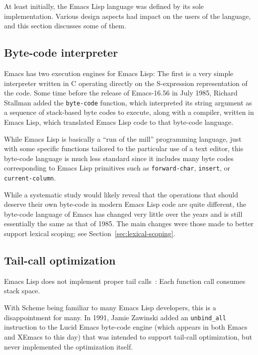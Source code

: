 \documentclass[format=acmsmall, review]{acmart}
\newcommand \Elisp {Emacs Lisp}
\begin{document}
At least initially, the \Elisp{} language was defined by its sole
implementation.  Various design aspects had impact on the users of the
language, and this section discusses some of them.

\subsection{Byte-code interpreter}
\label{sec:byte-code-interpreter}

Emacs has two execution engines for \Elisp: The first is a very simple
interpreter written in C operating directly on the S-expression
representation of the code.
Some time before the release of Emacs-16.56 in July 1985,
Richard Stallman added the \texttt{byte-code} function, which interpreted its string
argument as a sequence of stack-based byte codes to execute, along with
a compiler, written in \Elisp{}, which translated \Elisp{} code to that
byte-code language.

While \Elisp{} is basically a ``run of the mill'' programming language, just
with some specific functions tailored to the particular use of a text
editor, this byte-code language is much less standard since it includes many
byte codes corresponding to \Elisp{} primitives such as
\texttt{forward-char}, \texttt{insert}, or \texttt{current-column}.

While a systematic study would likely reveal that the operations that should
deserve their own byte-code in modern \Elisp{} code are quite different, the
byte-code language of Emacs has changed very little over the years and is
still essentially the same as that of 1985.  The main changes were
those made to better support lexical scoping; see Section~\ref{sec:lexical-scoping}.

\subsection{Tail-call optimization}
\label{sec:tco}

\Elisp{} does not implement proper tail calls~\cite{Clinger1998}: Each
function call consumes stack space.

With Scheme being familiar to
many \Elisp{} developers, this is a disappointment for many.
In 1991, Jamie Zawinski added an \texttt{unbind\_all} instruction to
the Lucid Emacs byte-code engine (which appears in both Emacs and
XEmacs to this day) that was intended to support tail-call optimization,
but never implemented the optimization itself.
\end{document}
